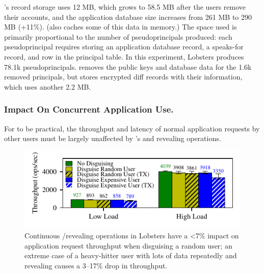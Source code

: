 %
\sys's \xx record storage uses 12 MB, which grows to
58.5 MB after the users remove their accounts, and the application database
size increases from 261 MB to 290 MB (+11\%).
%
(\sys also caches some of this data in memory.)
%
The space used is primarily proportional to the number of pseudoprincipals
produced: each pseudoprincipal requires storing an application database record, a
speaks-for record, and row in the principal table.
%
In this experiment, Lobsters produces 78.1k pseudoprincipals.
%
%
%
%
\sys removes the public keys and database data for the 1.6k removed principals, but
stores encrypted diff records with their information, which uses another 2.2 MB.
%
%

\subsubsection{Impact On Concurrent Application Use.}
\label{s:eval-conc}

%
%
%
For \sys to be practical, the throughput and latency of normal application requests
by other users must be largely unaffected by \sys's \xxing and revealing operations.
%
%

\begin{figure}[t]
    \centering
    \includegraphics{figs/lobsters_concurrent_results}
    \caption{Continuous \xxing/revealing operations in Lobsters
    have a <7\% impact on application request
    throughput when disguising a random user; an extreme case of a
    heavy-hitter user with lots of data repeatedly \xxing and revealing
    causes a 3--17\% drop in throughput.}
    \label{f:concurrent-lobsters}
\end{figure}

